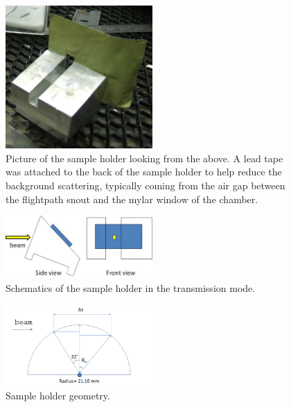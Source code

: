 \begin{figure}[htbp]
  \centering
  \includegraphics[width=0.5\textwidth]{figures/ripple/transmission/sample_holder1.jpg}
  \caption{Picture of the sample holder looking from the above. A lead tape was
  attached to the back of the sample holder to help reduce the background 
  scattering, typically coming from the air gap between the flightpath snout
  and the mylar window of the chamber.}
\end{figure}

\begin{figure}[htbp]
  \centering
  \includegraphics[width=0.5\textwidth]{figures/ripple/transmission/holder_drawing2}
  \caption{Schematics of the sample holder in the transmission mode.}
\end{figure}

\begin{figure}[htbp]
  \centering
  \includegraphics[width=0.5\textwidth]{figures/ripple/transmission/sgeometry.png}
  \caption{Sample holder geometry.}
  \label{fig:sample_holder}
\end{figure}



